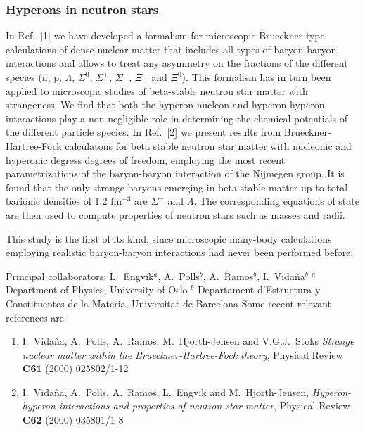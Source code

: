 \subsubsection{Hyperons in  neutron stars}
In Ref.~[1] we have developed a formalism for microscopic Brueckner-type calculations of dense nuclear matter that includes all types of
      baryon-baryon interactions and allows to treat any asymmetry on the fractions of the different species (n, p, $\Lambda$, $\Sigma^0$,
      $\Sigma^+$, $\Sigma^-$, $\Xi^-$ and $\Xi^0$). 
This formalism has in turn been applied to 
microscopic studies of beta-stable neutron star matter with strangeness. We find that both the
      hyperon-nucleon and hyperon-hyperon interactions play a non-negligible role in determining the chemical potentials of the different
      particle species. 
In Ref.~[2] we present results from Brueckner-Hartree-Fock calculatons for beta stable neutron star matter with nucleonic and hyperonic degress
      degrees of freedom, employing the most recent parametrizations of the baryon-baryon interaction of the Nijmegen group. It is found that
      the only strange baryons emerging in beta stable matter up to total barionic densities of 1.2 fm$^{-3}$ are $\Sigma^-$ and $\Lambda$. The
      corresponding equations of state are then used to compute properties of neutron stars such as masses and radii. 

This study is the first of its kind, since microscopic many-body
calculations employing realistic baryon-baryon interactions
had never been performed before. 



Principal collaborators: 
L.\ Engvik$^a$, A.\ Polls${}^b$, A.\ Ramos${}^b$,  I.\ Vida\~na${}^b$\newline
${}^a$ Department of Physics,
University of Oslo\newline
${}^{b}$ Departament d'Estructura y Constituentes de la Materia,
Universitat de Barcelona\newline\newline
Some recent relevant references are
\begin{enumerate}
\item I.\ Vida\~na, A.\ Polls, A.\ Ramos,   
       M.\ Hjorth-Jensen and V.G.J.\ Stoks
    {\em Strange nuclear matter within the Brueckner-Hartree-Fock theory},
    Physical Review {\bf C61} (2000) 025802/1-12
\item I.\ Vida\~na, A.\ Polls, A.\ Ramos, L.\ Engvik and  
       M.\ Hjorth-Jensen,
    {\em Hyperon-hyperon interactions and properties of neutron star matter},
    Physical Review {\bf C62} (2000) 035801/1-8

\end{enumerate}



